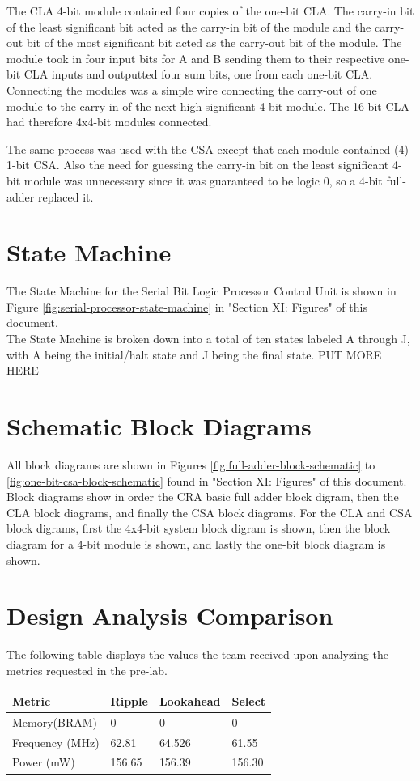 \documentclass[journal, twocolumn, final,11pt,letterpaper]{IEEEtran}
\begin{document}
The CLA 4-bit module contained four copies of the one-bit CLA. The carry-in bit of the least significant bit acted as the carry-in bit of the module and the carry-out bit of the most significant bit acted as the carry-out bit of the module.  The module took in four input bits for A and B sending them to their respective one-bit CLA inputs and outputted four sum bits, one from each one-bit CLA.  Connecting the modules was a simple wire connecting the carry-out of one module to the carry-in of the next high significant 4-bit module.  The 16-bit CLA had therefore 4x4-bit modules connected.

The same process was used with the CSA except that each module contained (4) 1-bit CSA.  Also the need for guessing the carry-in bit on the least significant 4-bit module was unnecessary since it was guaranteed to be logic 0, so a 4-bit full-adder replaced it.     

\section{State Machine}
The State Machine for the Serial Bit Logic Processor Control Unit is shown in Figure  \ref{fig:serial-processor-state-machine} in "Section XI: Figures" of this document.  \\

The State Machine is broken down into a total of ten states labeled A through J, with A being the initial/halt state and J being the final state. PUT MORE HERE
	
\section{Schematic Block Diagrams}
All block diagrams are shown in Figures \ref{fig:full-adder-block-schematic} to \ref{fig:one-bit-csa-block-schematic} found in "Section XI: Figures" of this document.  Block diagrams show in order the CRA basic full adder block digram, then the CLA block diagrams, and finally the CSA block diagrams.  For the CLA and CSA block digrams, first the 4x4-bit system block digram is shown, then the block diagram for a 4-bit module is shown, and lastly the one-bit block diagram is shown.    

\section{Design Analysis Comparison}
The following table displays the values the team received upon analyzing the metrics requested in the pre-lab.
\begin{center}
	\begin{tabular}{l|lll}
		Metric & Ripple & Lookahead & Select \\ \hline
		Memory(BRAM) & 0 & 0 & 0 \\
		Frequency (MHz) & 62.81 & 64.526 & 61.55\\
		Power (mW) & 156.65 & 156.39 & 156.30\\
	\end{tabular}
\end{center}
\end{document}
